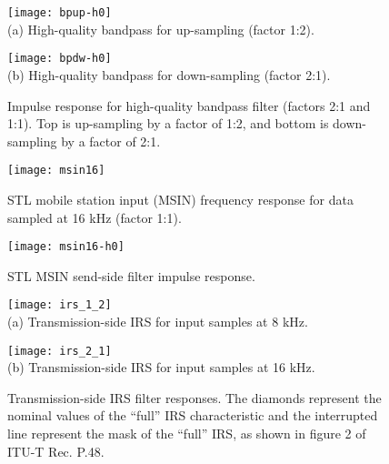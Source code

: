 \begin{figure}[hbtp]
  \begin{center}
 \texttt{[image: bpup-h0]}
 \\
   (a) High-quality bandpass for up-sampling (factor 1:2).

 \texttt{[image: bpdw-h0]}
 \\
   (b) High-quality bandpass for down-sampling (factor 2:1).

  \end{center}
  \caption{\SF Impulse response for high-quality
               bandpass filter (factors 2:1 and 1:1). Top is
               up-sampling by a factor of 1:2, and bottom is
               down-sampling by a factor of 2:1. \label{ir-bandpass}}
\end{figure}


\begin{figure}[hbtp]
  \begin{center}
 \texttt{[image: msin16]}
  \end{center}
  \caption{\SF STL mobile station input (MSIN) frequency response for data
               sampled at 16 kHz (factor 1:1).
           \label{msin-frq}
          }
\end{figure}


\begin{figure}[hbtp]
  \begin{center}
 \texttt{[image: msin16-h0]}
  \end{center}
  \caption{\SF STL MSIN send-side filter impulse response.
           \label{msin-ir}
          }
\end{figure}

\flushfloats

\begin{figure}[hbtp]
  \begin{center}
 \texttt{[image: irs\_1\_2]}
 \\
   (a) Transmission-side IRS for input samples at 8 kHz.

 \texttt{[image: irs\_2\_1]}
    \\
   (b) Transmission-side IRS for input samples at 16 kHz.

  \end{center}
  \caption{\SF Transmission-side IRS filter responses.
               The diamonds represent the nominal values of the
               ``full'' IRS characteristic and the interrupted line
               represent the mask of the ``full'' IRS, as shown in
               figure 2 of ITU-T Rec. P.48.
               \label{tx-reg-irs-frq}}
\end{figure}



